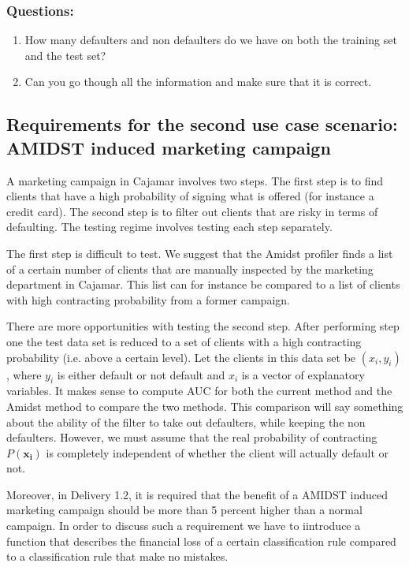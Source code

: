 \documentclass{article}
\theoremstyle{theorem}
\theoremstyle{definition}
\newcommand{\bv}[1]{\bm{#1}}
\begin{document}
{\subsubsection*{Questions: }
\begin{enumerate}
\item How many defaulters and non defaulters do we have on both the training set and the test set?
\item Can you go though all the information and make sure that it is correct.
\end{enumerate}


\subsection{Requirements for the second use case scenario:  AMIDST induced marketing campaign}

A marketing campaign in Cajamar involves two steps.  The first step is to find clients that have a high probability of signing what is offered (for instance a credit card).  The second step is to filter out clients that are risky in terms of defaulting.
The testing regime involves testing each step separately.

The first step is difficult to test. We suggest that the Amidst profiler finds a list of a certain number of clients that are manually inspected by the marketing department in Cajamar. This list can for instance be compared to a list of clients with high contracting probability from a former campaign.

There are more opportunities with testing the second step.  After performing step one the test data set is reduced to a set of clients with a high contracting probability (i.e. above a certain level).  Let the clients in this data set be $(x_i, y_i)$, where $y_i$ is either default or not default and $x_i$ is a vector of explanatory variables.  It makes sense to compute AUC for both the current method and the Amidst method to compare the two methods.  This comparison will say something about the ability of the filter to take out defaulters, while keeping the non defaulters.  However, we must assume that the real probability of contracting $P(\bv{x_i})$ is completely independent of whether the client will actually default or not.

Moreover, in Delivery 1.2, it is required that the benefit of a AMIDST induced marketing campaign should be more than 5 percent higher than a normal campaign.  In order to discuss such a requirement we have to iintroduce a function that describes the financial loss of a certain classification rule compared to a classification rule that make no mistakes. 

}
\end{document}
